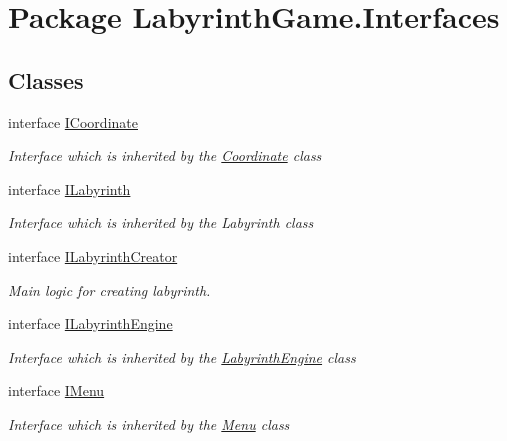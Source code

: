 \hypertarget{namespace_labyrinth_game_1_1_interfaces}{\section{Package Labyrinth\+Game.\+Interfaces}
\label{namespace_labyrinth_game_1_1_interfaces}
}
\subsection*{Classes}
\begin{DoxyCompactItemize}
\item 
interface \hyperlink{interface_labyrinth_game_1_1_interfaces_1_1_i_coordinate}{I\+Coordinate}
\begin{DoxyCompactList}\small\item\em Interface which is inherited by the \hyperlink{class_labyrinth_game_1_1_coordinate}{Coordinate} class \end{DoxyCompactList}\item 
interface \hyperlink{interface_labyrinth_game_1_1_interfaces_1_1_i_labyrinth}{I\+Labyrinth}
\begin{DoxyCompactList}\small\item\em Interface which is inherited by the Labyrinth class \end{DoxyCompactList}\item 
interface \hyperlink{interface_labyrinth_game_1_1_interfaces_1_1_i_labyrinth_creator}{I\+Labyrinth\+Creator}
\begin{DoxyCompactList}\small\item\em Main logic for creating labyrinth. \end{DoxyCompactList}\item 
interface \hyperlink{interface_labyrinth_game_1_1_interfaces_1_1_i_labyrinth_engine}{I\+Labyrinth\+Engine}
\begin{DoxyCompactList}\small\item\em Interface which is inherited by the \hyperlink{class_labyrinth_game_1_1_labyrinth_engine}{Labyrinth\+Engine} class \end{DoxyCompactList}\item 
interface \hyperlink{interface_labyrinth_game_1_1_interfaces_1_1_i_menu}{I\+Menu}
\begin{DoxyCompactList}\small\item\em Interface which is inherited by the \hyperlink{class_labyrinth_game_1_1_menu}{Menu} class \end{DoxyCompactList}\item 

\end{DoxyCompactItemize}
